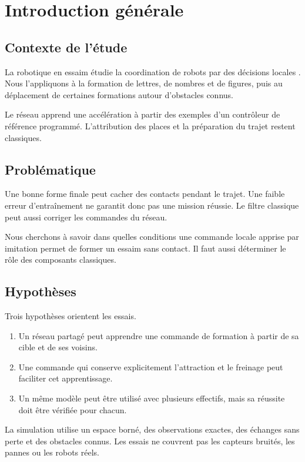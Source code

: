 \chapter*{Introduction générale}
{}
\label{chap:introduction}

\section{Contexte de l'étude}
La robotique en essaim étudie la coordination de robots par des décisions locales \cite{brambilla2013}. Nous l'appliquons à la formation de lettres, de nombres et de figures, puis au déplacement de certaines formations autour d'obstacles connus.

Le réseau apprend une accélération à partir des exemples d'un contrôleur de référence programmé. L'attribution des places et la préparation du trajet restent classiques.

\section{Problématique}
Une bonne forme finale peut cacher des contacts pendant le trajet. Une faible erreur d'entraînement ne garantit donc pas une mission réussie. Le filtre classique peut aussi corriger les commandes du réseau.

Nous cherchons à savoir dans quelles conditions une commande locale apprise par imitation permet de former un essaim sans contact. Il faut aussi déterminer le rôle des composants classiques.

\section{Hypothèses}
Trois hypothèses orientent les essais.
\begin{enumerate}\setlength{\itemsep}{0pt}
\item Un réseau partagé peut apprendre une commande de formation à partir de sa cible et de ses voisins.
\item Une commande qui conserve explicitement l'attraction et le freinage peut faciliter cet apprentissage.
\item Un même modèle peut être utilisé avec plusieurs effectifs, mais sa réussite doit être vérifiée pour chacun.
\end{enumerate}
La simulation utilise un espace borné, des observations exactes, des échanges sans perte et des obstacles connus. Les essais ne couvrent pas les capteurs bruités, les pannes ou les robots réels.

